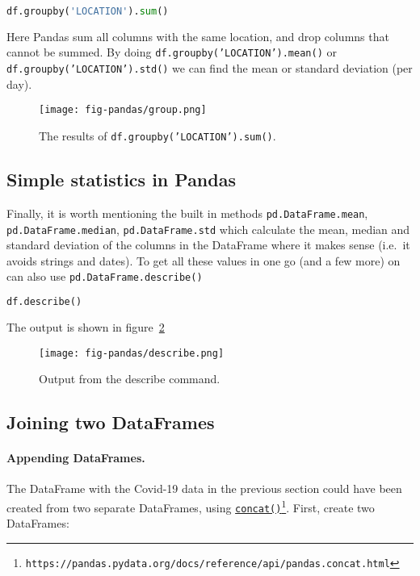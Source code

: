 \documentclass[graybox,sectrefs,envcountresetchap,open=right,final]{svmonodo}
\begin{document}
\begin{lstlisting}[language=python,style=blue1bar]
df.groupby('LOCATION').sum()

\end{lstlisting}

Here Pandas sum all columns with the same location, and drop columns that cannot be summed. By doing \texttt{df.groupby('LOCATION').mean()} or \texttt{df.groupby('LOCATION').std()} we can find the mean or standard deviation (per day).

\begin{figure}[!ht]  %
  \centerline{\texttt{[image: fig-pandas/group.png]}}
  \caption{
  The results of \texttt{df.groupby('LOCATION').sum()}. \label{fig:pandas:group}
  }
\end{figure}

\subsection{Simple statistics in Pandas}
Finally, it is worth mentioning the built in methods \texttt{pd.DataFrame.mean}, \texttt{pd.DataFrame.median}, \texttt{pd.DataFrame.std} which calculate the mean, median and standard deviation of the columns in the DataFrame where it makes sense (i.e.~it avoids strings and dates). To get all these values in one go (and a few more) on can also use \texttt{pd.DataFrame.describe()}


\begin{lstlisting}[language=python,style=blue1bar]
df.describe()

\end{lstlisting}

The output is shown in figure~\ref{fig:pandas:desc}

\begin{figure}[!ht]  %
  \centerline{\texttt{[image: fig-pandas/describe.png]}}
  \caption{
  Output from the describe command. \label{fig:pandas:desc}
  }
\end{figure}

\subsection{Joining two DataFrames}
\paragraph{Appending DataFrames.}
The DataFrame with the Covid-19 data in the previous section could have been created from two separate DataFrames, using \href{{https://pandas.pydata.org/docs/reference/api/pandas.concat.html}}{\nolinkurl{concat()}\footnote{\texttt{https://pandas.pydata.org/docs/reference/api/pandas.concat.html}}}. First, create two DataFrames: 
\end{document}
